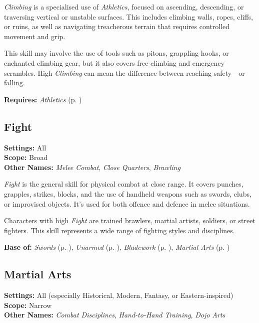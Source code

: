 \emph{Climbing} is a specialised use of \emph{Athletics}, focused on ascending, descending, or traversing vertical or unstable surfaces. This includes climbing walls, ropes, cliffs, or ruins, as well as navigating treacherous terrain that requires controlled movement and grip.

This skill may involve the use of tools such as pitons, grappling hooks, or enchanted climbing gear, but it also covers free-climbing and emergency scrambles. High \emph{Climbing} can mean the difference between reaching safety—or falling.

\vspace{0.5\baselineskip}
\noindent\textbf{Requires:} \emph{Athletics} (p. \pageref{skill:athletics})



\subsection{Fight}\label{skill:fight}
\textbf{Settings:} All\\
\textbf{Scope:} Broad\\
\textbf{Other Names:} \emph{Melee Combat}, \emph{Close Quarters}, \emph{Brawling}\\
\vspace{\baselineskip}

\emph{Fight} is the general skill for physical combat at close range. It covers punches, grapples, strikes, blocks, and the use of handheld weapons such as swords, clubs, or improvised objects. It’s used for both offence and defence in melee situations.

Characters with high \emph{Fight} are trained brawlers, martial artists, soldiers, or street fighters. This skill represents a wide range of fighting styles and disciplines.

\vspace{0.5\baselineskip}
\noindent\textbf{Base of:} \emph{Swords} (p. \pageref{skill:swords}), \emph{Unarmed} (p. \pageref{skill:unarmed}), \emph{Bladework} (p. \pageref{skill:bladework}), \emph{Martial Arts} (p. \pageref{skill:martial-arts})



\subsection{Martial Arts}\label{skill:martial-arts}
\textbf{Settings:} All (especially Historical, Modern, Fantasy, or Eastern-inspired)\\
\textbf{Scope:} Narrow\\
\textbf{Other Names:} \emph{Combat Disciplines}, \emph{Hand-to-Hand Training}, \emph{Dojo Arts}\\
\vspace{\baselineskip}

